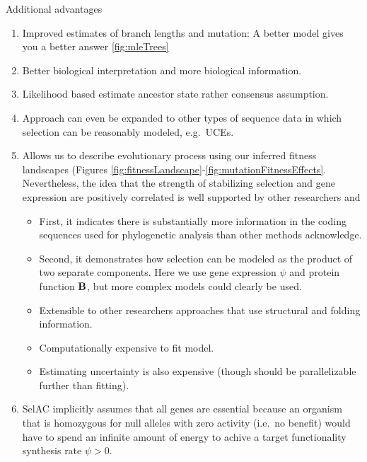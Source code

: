 \documentclass{article}
\newcommand{\Func}{\ensuremath{\text{\textbf{B}}}\xspace}
\newcommand{\selac}{SelAC\xspace}
\begin{document}



Additional advantages
\begin{enumerate}
\item Improved estimates of branch lengths and mutation: A better model gives you a better answer \ref{fig:mleTrees}
\item Better biological interpretation and more biological information.
\item Likelihood based estimate ancestor state rather consensus assumption.
\item Approach can even be expanded to other types of sequence data in which selection can be reasonably modeled, e.g.~UCEs.
\item Allows us to describe evolutionary process using our inferred fitness landscapes (Figures \ref{fig:fitnessLandscape}-\ref{fig:mutationFitnessEffects}.
Nevertheless, the idea that the strength of stabilizing selection and gene expression are positively correlated is well supported by other researchers \citep[e.g.~][]{DrummondEtAl2005} and 
\begin{itemize}
\item First, it indicates there is substantially more information in the coding sequences used for phylogenetic analysis than other methods acknowledge.
\item Second, it demonstrates how selection can be modeled as the product of two separate components.
  Here we use gene expression $\psi$ and protein function \Func, but more complex models could clearly be used.  
\item Extensible to other researchers approaches that use structural and folding  information.
\item Computationally expensive to fit model.
\item Estimating uncertainty is also expensive (though should be parallelizable further than fitting).
\end{itemize}
\item \selac implicitly assumes that all genes are essential because an organism that is homozygous for null alleles with zero activity (i.e.~no benefit) would have to spend an infinite amount of energy to achive a target functionality synthesis rate $\psi > 0$.

\end{enumerate}
\end{document}
